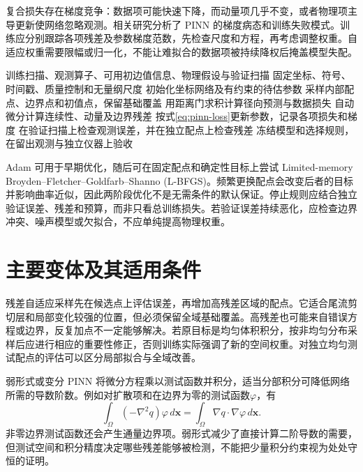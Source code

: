 复合损失存在梯度竞争：数据项可能快速下降，而动量项几乎不变，或者物理项主导更新使网络忽略观测。相关研究分析了 PINN 的梯度病态和训练失败模式\cite{wang2021gradient,krishnapriyan2021failure}。训练应分别跟踪各项残差及参数梯度范数，先检查尺度和方程，再考虑调整权重。自适应权重需要限幅或归一化，不能让难拟合的数据项被持续降权后掩盖模型失配。

\begin{algorithm}[htbp]
\caption{稀疏激光雷达风场重建的 PINN 训练}
\label{alg:pinn-wind}
\begin{algorithmic}[1]
\Require 训练扫描、观测算子、可用初边值信息、物理假设与验证扫描
\State 固定坐标、符号、时间戳、质量控制和无量纲尺度
\State 初始化坐标网络及有约束的待估参数
 \State 采样内部配点、边界点和初值点，保留基础覆盖
 \State 用距离门求积计算径向预测与数据损失
 \State 自动微分计算连续性、动量及边界残差
 \State 按式\eqref{eq:pinn-loss}更新参数，记录各项损失和梯度
 \State 在验证扫描上检查观测误差，并在独立配点上检查残差
\EndFor
\State 冻结模型和选择规则，在留出观测与独立仪器上验收
\end{algorithmic}
\end{algorithm}

Adam 可用于早期优化，随后可在固定配点和确定性目标上尝试 Limited-memory Broyden--Fletcher--Goldfarb--Shanno (L-BFGS)。频繁更换配点会改变后者的目标并影响曲率近似，因此两阶段优化不是无需条件的默认保证。停止规则应结合独立验证误差、残差和预算，而非只看总训练损失。若验证误差持续恶化，应检查边界冲突、噪声模型或欠拟合，不应单纯提高物理权重。

\section{主要变体及其适用条件}
残差自适应采样先在候选点上评估误差，再增加高残差区域的配点。它适合尾流剪切层和局部变化较强的位置，但必须保留全域基础覆盖。高残差也可能来自错误方程或边界，反复加点不一定能够解决。若原目标是均匀体积积分，按非均匀分布采样后应进行相应的重要性修正，否则训练实际强调了新的空间权重。对独立均匀测试配点的评估可以区分局部拟合与全域改善。

弱形式或变分 PINN 将微分方程乘以测试函数并积分，适当分部积分可降低网络所需的导数阶数\cite{kharazmi2021hpvpinn}。例如对扩散项和在边界为零的测试函数$\varphi$，有
\begin{equation}
 \int_\Omega(-\nabla^2q)\varphi\,d\mathbf x
 =\int_\Omega\nabla q\cdot\nabla\varphi\,d\mathbf x.
\end{equation}
非零边界测试函数还会产生通量边界项。弱形式减少了直接计算二阶导数的需要，但测试空间和积分精度决定哪些残差能够被检测，不能把少量积分约束视为处处守恒的证明。

